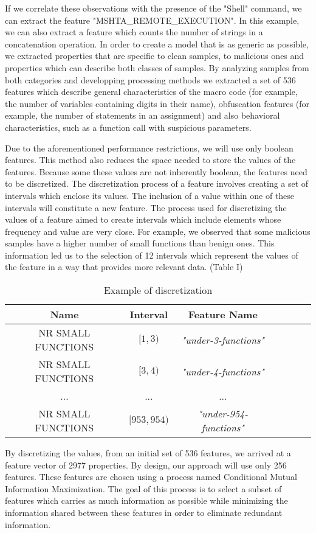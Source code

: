  If we correlate these observations with the presence of  the "Shell" command, we can extract the feature "MSHTA\_REMOTE\_EXECUTION". In this example, we can also extract a feature which counts the number of strings in a concatenation operation. In order to create a model that is as generic as possible, we extracted properties that are specific to clean samples, to malicious ones and properties which can describe both classes of samples. By analyzing samples from both categories and developping processing methods we extracted a set of 536 features which describe general characteristics of the macro code (for example, the number of variables containing digits in their name), obfuscation features (for example, the number of statements in an assignment) and also behavioral characteristics, such as a function call with suspicious parameters.
\par
Due to the aforementioned performance restrictions, we will use only boolean features. This method also reduces the space needed to store the values of the features. Because some these values are not inherently boolean, the features need to be discretized. The discretization process of a feature involves creating a set of intervals which enclose its values. The inclusion of a value within one of these intervals will constitute a new feature. The process used for discretizing the values of a feature aimed to create intervals which include elements whose frequency and value are very close.  For example, we observed that some malicious samples have a higher number of small functions than benign ones. This information led us to the selection of 12 intervals which represent the values of the feature in a way that provides more relevant data. (Table I)
\begin{table}[ht]
    \centering
    \begin{tabular}{| c | c | c | c | c | c | c | }
    \hline
    Name & Interval & Feature Name\\ \hline
    NR SMALL FUNCTIONS & $[1, 3)$ & \textit{"under-3-functions"}  \\ \hline
    NR SMALL FUNCTIONS & $[3, 4)$ & \textit{"under-4-functions"}  \\ \hline
    ... & ... & ... \\ \hline   
    NR SMALL FUNCTIONS & $[953, 954) $ & \textit{"under-954-functions"}  \\ \hline
    \end{tabular}
    \caption{Example of discretization} 
    \label{tab:discretizationeg}
\end{table}
\par
By discretizing the values, from an initial set of 536 features, we arrived at a feature vector of 2977 properties. By design, our approach will use only 256 features. These features are chosen using a process named Conditional Mutual Information Maximization\cite{fleuret}. The goal of this process is to select a subset of features which carries as much information as possible while minimizing the information shared between these features in order to eliminate redundant information.